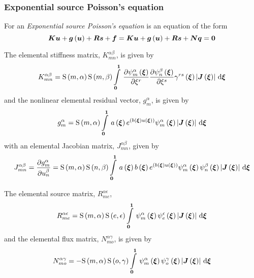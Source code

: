 \subsubsection{Exponential source Poisson's equation}

For an \emph{Exponential source Poisson's equation}
 is an equation of the form
\begin{equation}
  \matr{K}\vect{u}+\fnof{\vect{g}}{\vect{u}}+\matr{R}\vect{s}+\vect{f}=\matr{K}\vect{u}+\fnof{\vect{g}}{\vect{u}}+\matr{R}\vect{s}+\matr{N}\vect{q}=\vect{0}
\end{equation}

The elemental stiffness matrix, $K^{\alpha\beta}_{mn}$, is given by
\begin{equation}
  K^{\alpha\beta}_{mn}=\gsf{m}{\alpha}\gsf{m}{\beta}
  \gint{\vectr{0}}{\vectr{1}}{\delby{\gbfn{m}{\alpha}{\vectr{\xi}}}{\xi^{r}}
      \delby{\gbfn{n}{\beta}{\vectr{\xi}}}{\xi^{s}}\fnof{\gamma^{rs}}{\vectr{\xi}}
    \abs{\fnof{\matr{J}}{\vectr{\xi}}}}{\vectr{\xi}}
  \label{eqn:elementalfemlhs2}
\end{equation}
and the nonlinear elemental residual vector, $g^{\alpha}_{m}$, is given by
\begin{equation}
  g^{\alpha}_{m}=\gsf{m}{\alpha}\gint{\vectr{0}}{\vectr{1}}{\fnof{a}{\vectr{\xi}}
    e^{\pbrac{\fnof{b}{\vectr{\xi}}\fnof{u}{\vectr{\xi}}}}\gbfn{m}{\alpha}{\vectr{\xi}}
    \abs{\fnof{\matr{J}}{\vectr{\xi}}}}{\vectr{\xi}}
\end{equation}
with an elemental Jacobian matrix, $J^{\alpha\beta}_{mn}$, given by
\begin{equation}
  J^{\alpha\beta}_{mn}=\delby{g^{\alpha}_{m}}{u^{\beta}_{n}}=\gsf{m}{\alpha}\gsf{n}{\beta}\gint{\vectr{0}}{\vectr{1}}{
    \fnof{a}{\vectr{\xi}}\fnof{b}{\vectr{\xi}}e^{\pbrac{\fnof{b}{\vectr{\xi}}\fnof{u}{\vectr{\xi}}}}
    \gbfn{m}{\alpha}{\vectr{\xi}}\gbfn{n}{\beta}{\vectr{\xi}}
    \abs{\fnof{\matr{J}}{\vectr{\xi}}}}{\vectr{\xi}}
\end{equation}

The elemental source matrix, $R^{\alpha\epsilon}_{me}$, 
\begin{equation}
  R^{\alpha\epsilon}_{me}=\gsf{m}{\alpha}\gsf{e}{\epsilon}
  \gint{\vectr{0}}{\vectr{1}}{\gbfn{m}{\alpha}{\vectr{\xi}}\gbfn{e}{\epsilon}{\vectr{\xi}}
    \abs{\fnof{\matr{J}}{\vectr{\xi}}}}{\vectr{\xi}}
\end{equation}
and the elemental flux matrix, $N^{\alpha\gamma}_{mo}$, is given by
\begin{equation}
  N^{\alpha\gamma}_{mo} =-\gsf{m}{\alpha}\gsf{o}{\gamma}
  \gint{\vectr{0}}{\vectr{1}}{\gbfn{m}{\alpha}{\vectr{\xi}}\gbfn{o}{\gamma}{\vectr{\xi}}
    \abs{\fnof{\matr{J}}{\vectr{\xi}}}}{\vectr{\xi}}
\end{equation}


